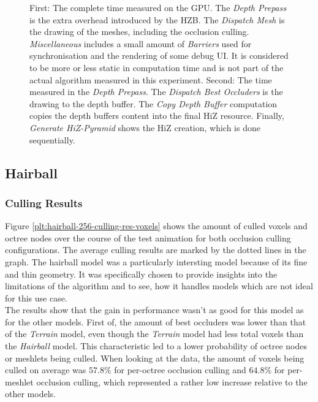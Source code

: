 \begin{figure}[!htb]
  \label{fig:terrain-gpu-times}
  \caption{First: The complete time measured on the \ac{GPU}. The \emph{Depth Prepass} is the extra overhead 
  introduced by the \ac{HZB}. The \emph{Dispatch Mesh} is the drawing of the meshes, including the occlusion 
  culling. \emph{Miscellaneous} includes a small amount of \emph{Barriers} used for synchronisation and the 
  rendering of some debug \ac{UI}. It is considered to be more or less static in computation time and is not 
  part of the actual algorithm measured in this experiment. Second: The time measured in the \emph{Depth Prepass}. 
  The \emph{Dispatch Best Occluders} is the drawing to the depth buffer. The \emph{Copy Depth Buffer} computation 
  copies the depth buffers content into the final \ac{HiZ} resource. Finally, \emph{Generate HiZ-Pyramid} shows 
  the \ac{HiZ} creation, which is done sequentially.}
\end{figure}


\clearpage




\subsection*{Hairball}

\subsubsection*{Culling Results} \label{subsubsec-culling-results-hairball}

Figure \ref{plt:hairball-256-culling-res-voxels} shows the amount of culled voxels and octree nodes 
over the course of the test animation for both occlusion culling configurations. The average culling 
results are marked by the dotted lines in the graph. The hairball model was a particularly intersting 
model because of its fine and thin geometry. It was specifically chosen to provide insights into the 
limitations of the algorithm and to see, how it handles models which are not ideal for this use case.\\

\noindent
The results show that the gain in performance wasn't as good for this model as for the other models.
First of, the amount of best occluders was lower than that of the \emph{Terrain} model, even though the 
\emph{Terrain} model had less total voxels than the \emph{Hairball} model. This characteristic led to 
a lower probability of octree nodes or meshlets being culled. When looking at the data, the amount of 
voxels being culled on average was $57.8\%$ for per-octree occlusion culling and $64.8\%$ for per-meshlet 
occlusion culling, which represented a rather low increase relative to the other models. 

